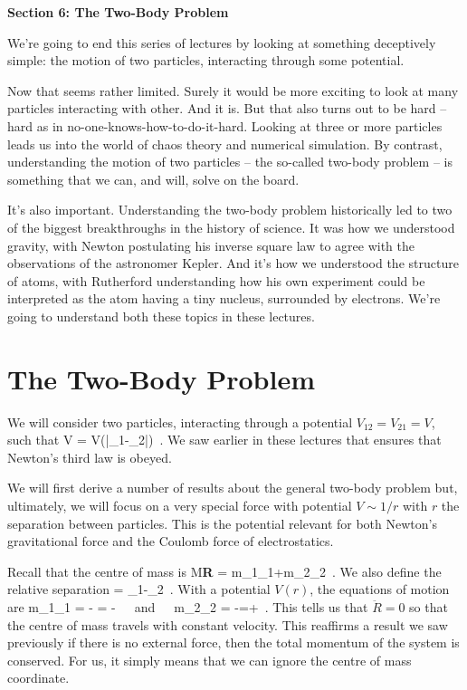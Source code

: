 {\Large \bf Section 6: The Two-Body Problem}

\vskip 3mm
We're going to end this series of  lectures by looking at something deceptively simple: the motion of two particles, interacting through some potential. 

\para
Now that seems rather limited. Surely it would be more exciting to look at many particles interacting with other. And it is. But that also turns out to be hard -- hard as in no-one-knows-how-to-do-it-hard. Looking at three or more particles leads us into the world of chaos theory and numerical simulation. By contrast, understanding the motion of two particles -- the so-called two-body problem -- is something that we can, and will, solve on the board.

\para
It's also important. Understanding the two-body problem historically led to two of the biggest breakthroughs in the history of science. It was how we understood gravity, with Newton postulating his inverse square law to agree with the observations of the astronomer Kepler. And it's how we understood the structure of atoms, with Rutherford understanding how his own experiment could be interpreted as the atom having a tiny nucleus, surrounded by electrons. We're going to understand both these topics in these lectures. 

\section{The Two-Body Problem}

{\co We will consider two particles, interacting through a potential  $V_{12}=V_{21}=V$, such that
%
\be V = V(|\bx_1-\bx_2|)\ .\label{2bodypot}\ee
%
}
We saw earlier in these lectures that ensures that Newton's third law is obeyed. 

\para
We will first derive a number of results about the general two-body problem but, ultimately, we will focus on a very special force with potential $V\sim 1/r$ with $r$ the separation between particles. This is the potential relevant for both Newton's gravitational force and the Coulomb force of electrostatics. 


\para
{\co Recall that the centre of mass is
%
\be M{\bf R} = m_1\vecx_1+m_2\vecx_2\ .\ee
%
We  also define the relative separation
%
 = \vecx_1-\vecx_2\ .\ee
%
With a potential $V(r)$, the equations of motion are
%
\be m_1\ddot{\bx}_1 = - = -\ \ \ {\rm and}\ \ \ m_2\ddot{\bx}_2 = -=+\hat{\br}\ .\ee
%
This tells us that $\ddot{R}=0$} so that the centre of mass travels with constant velocity. This reaffirms a result we saw previously if there is no external force, then the total momentum of the system is conserved. For us, it  simply means that we can ignore the centre of mass coordinate. 

